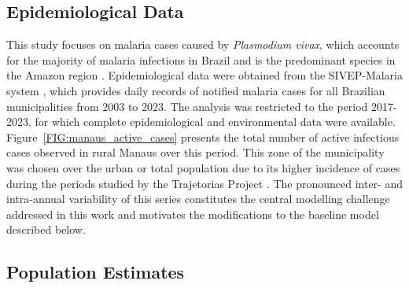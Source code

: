\documentclass[a4paper,fleqn]{cas-dc}
\begin{document}
\subsection{Epidemiological Data}
\label{sec:epidemiological_data}

This study focuses on malaria cases caused by \textit{Plasmodium vivax}, which accounts for the majority 
of malaria infections in Brazil and is the predominant species in the Amazon 
region \cite{OliveiraFerreira2010, 10.3389/fpubh.2021.647754, Vector_Incrimination}. 
Epidemiological data were obtained from the SIVEP-Malaria system \cite{SIVEP_Malaria}, 
which provides daily records of notified malaria cases for all Brazilian municipalities from 
2003 to 2023. The analysis was restricted to the period 2017-2023, for which complete epidemiological and environmental data were available.
Figure~\ref{FIG:manaus_active_cases} presents the total number of active infectious cases observed in rural Manaus over this period. This zone of the municipality was chosen over the urban or total population 
due to its higher incidence of cases during the periods studied by the Trajetorias Project \cite{Rorato2023}.
The pronounced inter- and intra-annual variability of this series constitutes the central modelling challenge addressed in this work and motivates the modifications to the baseline model described below.

\subsection{Population Estimates}
\label{sec:population_estimates}
\end{document}

